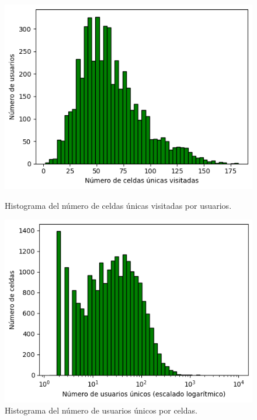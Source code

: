 \begin{figure}[!htb]
\centering
\begin{minipage}{0.45\textwidth}
    \centering
    \includegraphics[width=\textwidth]{Graphics/unique_cell_per_user_histogram.png}
    \caption{Histograma del número de celdas únicas visitadas por usuarios.}
    \label{fig:unique_cell_per_user_histogram}
\end{minipage}%
\hfill
\begin{minipage}{0.45\textwidth}
    \centering
    \includegraphics[width=\textwidth]{Graphics/unique_user_per_cell_histogram.png}
    \caption{Histograma del número de usuarios únicos por celdas.}
    \label{fig:unique_user_per_cell_histogram}
\end{minipage}%
\end{figure}

